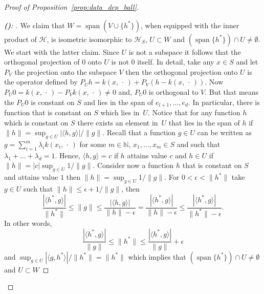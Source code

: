 \documentclass[10pt]{amsart}
\theoremstyle{definition}\newtheorem{defi}[theo]{Definition}\newtheorem{rema}[theo]{Remark}\newtheorem{exam}[theo]{Example}\newtheorem{exem}[theo]{Example}\newtheorem{nota}[theo]{Notation}
\theoremstyle{remark}
\DeclareMathOperator{\spn}{span}
\newcommand{\bbN}{\mathbb{N}}
\newcommand{\cH}{\mathcal{H}}
\newcounter{setofstep}
\newcounter{step}[setofstep]
\newenvironment{step}[1][]{\refstepcounter{step}\begin{proof}[{\textbf{(\thestep)}\if#1\empty\else: #1\fi}]}{\let\qed\relax\end{proof}}
\renewcommand{\thestep}{\alph{step}}
\newenvironment{proofc}[1][\proofname]{\begin{proof}[{#1}]}{\end{proof}}\AtBeginDocument{\special{pdf:mapfile +yhmath.map}}
\begin{document}
\begin{proofc}[{Proof of Proposition~\ref{prop:data_dep_ball}}]
\begin{step}\label{prfprop2.15stp6}
We claim that $W = \spn(V \cup \{h^*\})$, when equipped with the inner product of $\cH$, is isometric isomorphic to $\cH_S$, $U \subset W$ and $(\spn \{h^*\}) \cap U \not = \emptyset$. We start with the latter claim. Since $U$ is not a subspace it follows that the orthogonal projection of $0$ onto $U$ is not $0$ itself. In detail, take any $x\in S$ and let $P_V$ the projection onto the subspace $V$ then the orthogonal projection onto $U$ is the operator defined by $P_U h = k(x,\,\cdot\,) + P_V(h - k(x,\,\cdot\,))$. Now $P_U 0 = k(x,\,\cdot\,) - P_V k(x,\,\cdot\,) \not = 0$ and, $P_U 0$ is orthogonal to $V$. But that means the $P_U 0$ is constant on $S$ and lies in the span of $e_{l+1},\dots, e_d$. In particular, there is function that is constant on $S$ which lies in~$U$. Notice that for any function $h$ which is constant on $S$ there exists an element in~$U$ that lies in the span of $h$ if $\|h\| = \sup_{g\in U} |\langle h, g \rangle|/\|g\|$. Recall that a function $g \in U$ can be written as $g = \sum_{i=1}^m \lambda_i k(x_i,\,\cdot\,)$ for some $m\in \bbN$, $x_1,\dots, x_m \in S$ and such that $\lambda_1 + \dots + \lambda_d = 1$. Hence, $\langle h, g \rangle = c$ if $h$ attains value $c$ and $h \in U$ if $\|h\| = |c| \sup_{g \in U} 1/\|g\|$. Consider now a function $h$ that is constant on $S$ and attains value $1$ then $\|h\| = \sup_{g \in U} 1/\|g\|$. For $0 < \epsilon < \|h^*\| $ take $g \in U$ such that $\|h\| \leq \epsilon + 1/\|g\|$, then
\[
\frac{|\langle h^*, g \rangle|}{\|h^*\|} \leq \|g\| \leq \frac{|\langle h, g \rangle|}{\|h\| - \epsilon} = \frac{|\langle h^*, g \rangle|}{\|h\| - \epsilon} \leq \frac{|\langle h^*, g \rangle|}{\|h^*\| - \epsilon}.
\]
In other words,
\[
\frac{|\langle h^*, g \rangle|}{\|g\|} \leq \|h^*\| \leq \frac{|\langle h^*, g \rangle|}{\|g\|} + \epsilon
\]
and $\sup_{g \in U} |\langle g, h^* \rangle|/\|h^*\| = \|h^*\|$ which implies that $(\spn \{h^*\}) \cap U \not = \emptyset$ and $U\subset W$




\end{step}
\end{proofc}
\end{document}
